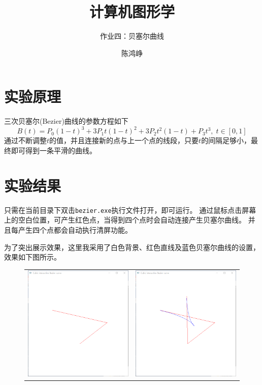 \documentclass[logo,reportComp]{thesis}
\title{计算机图形学}
\subtitle{作业四：贝塞尔曲线}
\author{陈鸿峥}
\begin{document}
\maketitle

\section{实验原理}
三次贝塞尔(Bezier)曲线的参数方程如下
\[B(t) = P_0 (1-t)^3 + 3P_1 t(1-t)^2 + 3P_2 t^2(1-t) + P_3 t^3,\;t\in[0,1]\]
通过不断调整$t$的值，并且连接新的点与上一个点的线段，只要$t$的间隔足够小，最终即可得到一条平滑的曲线。

\section{实验结果}
只需在当前目录下双击\verb'bezier.exe'执行文件打开，即可运行。
通过鼠标点击屏幕上的空白位置，可产生红色点，当得到四个点时会自动连接产生贝塞尔曲线。
并且每产生四个点都会自动执行清屏功能。

为了突出展示效果，这里我采用了白色背景、红色直线及蓝色贝塞尔曲线的设置，效果如下图所示。
\begin{figure}[H]
\begin{tabular}{cc}
\includegraphics[width=0.5\linewidth]{fig/res1.png}&
\includegraphics[width=0.5\linewidth]{fig/res2.png}
\end{tabular}
\end{figure}
\end{document}
